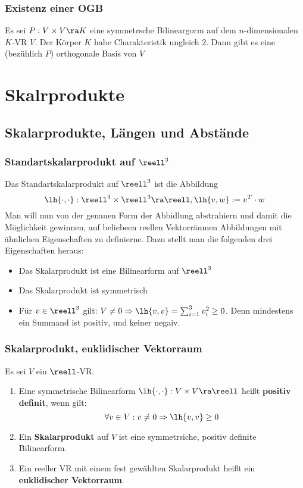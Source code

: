 \documentclass{kit}
\begin{document}
    \subsubsection{Existenz einer OGB}
      Es sei $P:V\times V\ra K$ eine symmetrsche Bilineargorm auf dem $n$-dimensionalen $K$-VR $V$. Der Körper $K$ habe 
      Charakteristik ungleich 2. Dann gibt es eine (bezühlich $P$) orthogonale Basis von $V$
\section{Skalrprodukte}
  \subsection{Skalarprodukte, Längen und Abstände}
    \subsubsection{Standartskalarprodukt auf \texorpdfstring{$\reell^3$}{}}
      Das Standartskalarprodukt auf $\reell^3$ ist die Abbildung
      $$\lh{\cdot,\cdot}:\reell^3\times\reell^3\ra\reell,\lh{v,w}:=v^T\cdot w$$
      Man will nun von der genauen Form der Abbidlung abstrahiern und damit die Möglichkeit gewinnen, auf beliebeen reellen
      Vektorräumen Abbildungen mit ähnlichen Eigenschaften zu definierne. Dazu stellt man die folgenden drei Eigenschaften
      heraus:
      \begin{itemize}
        \item Das Skalarprodukt ist eine Bilinearform auf $\reell^3$
        \item Das Skalarprodukt ist symmetrisch
        \item Für $v\in\reell^3$ gilt: $V\neq0\Rightarrow\lh{v,v}=\sum_{i=1}^3v_i^2\ge0$. Denn mindestens ein Summand
          ist positiv, und keiner negaiv.
      \end{itemize}
    \subsubsection{Skalarprodukt, euklidischer Vektorraum}
      Es sei $V$ ein $\reell$-VR.
      \begin{enumerate}
        \item Eine symmetrische Bilinearform $\lh{\cdot,\cdot}:V\times V\ra\reell$ heißt \textbf{positiv definit}, wenn 
          gilt:
        $$\forall v\in V:v\neq0\Rightarrow\lh{v,v}\ge0$$
        \item Ein \textbf{Skalarprodukt} auf $V$ ist eine symmetrsiche, positiv definite Bilinearform.
        \item Ein reeller VR mit einem fest gewählten Skalarprodukt heißt ein \textbf{euklidischer Vektorraum}.
      \end{enumerate}
\end{document}
